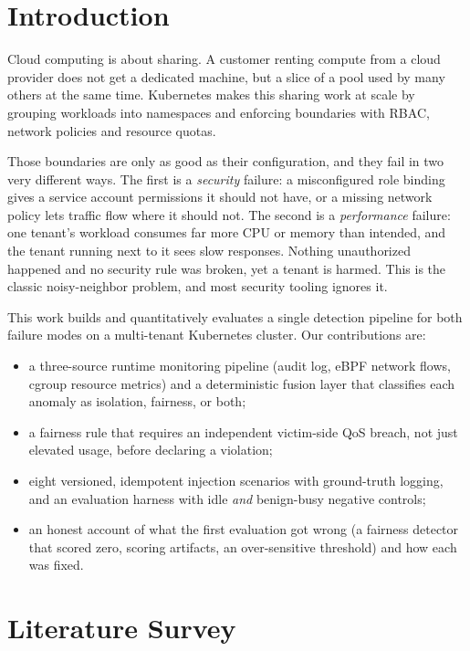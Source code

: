 \documentclass[conference]{IEEEtran}
\begin{document}
\section{Introduction}
Cloud computing is about sharing. A customer renting compute from a cloud provider does not get a dedicated machine, but a slice of a pool used by many others at the same time. Kubernetes makes this sharing work at scale by grouping workloads into namespaces and enforcing boundaries with RBAC, network policies and resource quotas.

Those boundaries are only as good as their configuration, and they fail in two very different ways. The first is a \emph{security} failure: a misconfigured role binding gives a service account permissions it should not have, or a missing network policy lets traffic flow where it should not. The second is a \emph{performance} failure: one tenant's workload consumes far more CPU or memory than intended, and the tenant running next to it sees slow responses. Nothing unauthorized happened and no security rule was broken, yet a tenant is harmed. This is the classic noisy-neighbor problem, and most security tooling ignores it.

This work builds and quantitatively evaluates a single detection pipeline for both failure modes on a multi-tenant Kubernetes cluster. Our contributions are:
\begin{itemize}
\item a three-source runtime monitoring pipeline (audit log, eBPF network flows, cgroup resource metrics) and a deterministic fusion layer that classifies each anomaly as isolation, fairness, or both;
\item a fairness rule that requires an independent victim-side QoS breach, not just elevated usage, before declaring a violation;
\item eight versioned, idempotent injection scenarios with ground-truth logging, and an evaluation harness with idle \emph{and} benign-busy negative controls;
\item an honest account of what the first evaluation got wrong (a fairness detector that scored zero, scoring artifacts, an over-sensitive threshold) and how each was fixed.
\end{itemize}

\section{Literature Survey}
\end{document}
